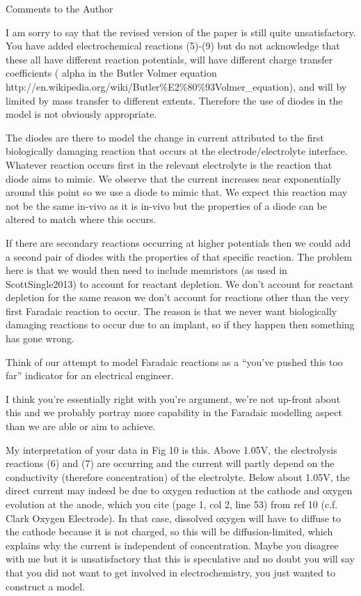 \documentclass[journal, a4paper]{IEEEtran}
\begin{document}
Comments to the Author

{\color{OliveGreen}
    I am sorry to say that the revised version of the paper is still quite unsatisfactory. You have added electrochemical reactions (5)-(9) but do not acknowledge that these all have different reaction potentials, will have different charge transfer coefficients ( alpha in the Butler Volmer equation http://en.wikipedia.org/wiki/Butler\%E2\%80\%93Volmer\_equation), and will by limited by mass transfer to different extents. Therefore the use of diodes in the model is not obviously appropriate.

    {
        \color{blue}
        The diodes are there to model the change in current attributed to the first biologically damaging reaction that occurs at the electrode/electrolyte interface. Whatever reaction occurs first in the relevant electrolyte is the reaction that diode aims to mimic. We observe that the current increases near exponentially around this point so we use a diode to mimic that. We expect this reaction may not be the same in-vivo as it is in-vivo but the properties of a diode can be altered to match where this occurs.

        If there are secondary reactions occurring at higher potentials then we could add a second pair of diodes with the properties of that specific reaction. The problem here is that we would then need to include memristors (as used in ScottSingle2013) to account for reactant depletion. We don't account for reactant depletion for the same reason we don't account for reactions other than the very first Faradaic reaction to occur. The reason is that we never want biologically damaging reactions to occur due to an implant, so if they happen then something has gone wrong.

        Think of our attempt to model Faradaic reactions as a ``you've pushed this too far'' indicator for an electrical engineer.

        I think you're essentially right with you're argument, we're not up-front about this and we probably portray more capability in the Faradaic modelling aspect than we are able or aim to achieve.
    }

    My interpretation of your data in Fig 10 is this. Above 1.05V, the electrolysis reactions (6) and (7) are occurring and the current will partly depend on the conductivity (therefore concentration) of the electrolyte. Below about 1.05V, the direct current may indeed be due to oxygen reduction at the cathode and oxygen evolution at the anode, which you cite (page 1, col 2, line 53) from ref 10 (c.f. Clark Oxygen Electrode). In that case, dissolved oxygen will have to diffuse to the cathode because it is not charged, so this will be diffusion-limited, which explains why the current is independent of concentration. Maybe you disagree with me but it is unsatisfactory that this is speculative and no doubt you will say that you did not want to get involved in electrochemistry, you just wanted to construct a model.

}
\end{document}
